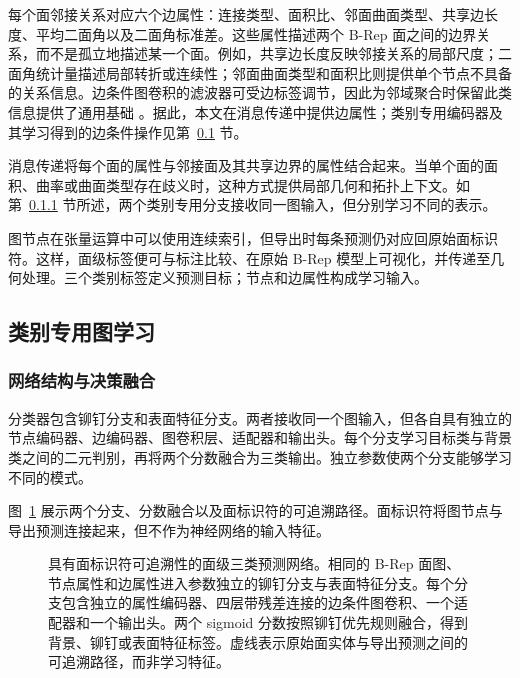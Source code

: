 \documentclass[12pt,a4paper]{ctexart}
\begin{document}
每个面邻接关系对应六个边属性：连接类型、面积比、邻面曲面类型、共享边长度、平均二面角以及二面角标准差。这些属性描述两个 B-Rep 面之间的边界关系，而不是孤立地描述某一个面。例如，共享边长度反映邻接关系的局部尺度；二面角统计量描述局部转折或连续性；邻面曲面类型和面积比则提供单个节点不具备的关系信息。边条件图卷积的滤波器可受边标签调节，因此为邻域聚合时保留此类信息提供了通用基础 \parencite{simonovsky2017dynamic}。据此，本文在消息传递中提供边属性；类别专用编码器及其学习得到的边条件操作见第~\ref{sec:class_specific_learning} 节。

消息传递将每个面的属性与邻接面及其共享边界的属性结合起来。当单个面的面积、曲率或曲面类型存在歧义时，这种方式提供局部几何和拓扑上下文。如第~\ref{sec:dual_gnn} 节所述，两个类别专用分支接收同一图输入，但分别学习不同的表示。

图节点在张量运算中可以使用连续索引，但导出时每条预测仍对应回原始面标识符。这样，面级标签便可与标注比较、在原始 B-Rep 模型上可视化，并传递至几何处理。三个类别标签定义预测目标；节点和边属性构成学习输入。

\subsection{类别专用图学习}\label{sec:class_specific_learning}

\subsubsection{网络结构与决策融合}\label{sec:dual_gnn}

分类器包含铆钉分支和表面特征分支。两者接收同一个图输入，但各自具有独立的节点编码器、边编码器、图卷积层、适配器和输出头。每个分支学习目标类与背景类之间的二元判别，再将两个分数融合为三类输出。独立参数使两个分支能够学习不同的模式。

图~\ref{fig:class_specific_gnn} 展示两个分支、分数融合以及面标识符的可追溯路径。面标识符将图节点与导出预测连接起来，但不作为神经网络的输入特征。

\begin{figure}[!ht]
\centering

\caption{具有面标识符可追溯性的面级三类预测网络。相同的 B-Rep 面图、节点属性和边属性进入参数独立的铆钉分支与表面特征分支。每个分支包含独立的属性编码器、四层带残差连接的边条件图卷积、一个适配器和一个输出头。两个 sigmoid 分数按照铆钉优先规则融合，得到背景、铆钉或表面特征标签。虚线表示原始面实体与导出预测之间的可追溯路径，而非学习特征。}
\label{fig:class_specific_gnn}
\end{figure}
\end{document}
